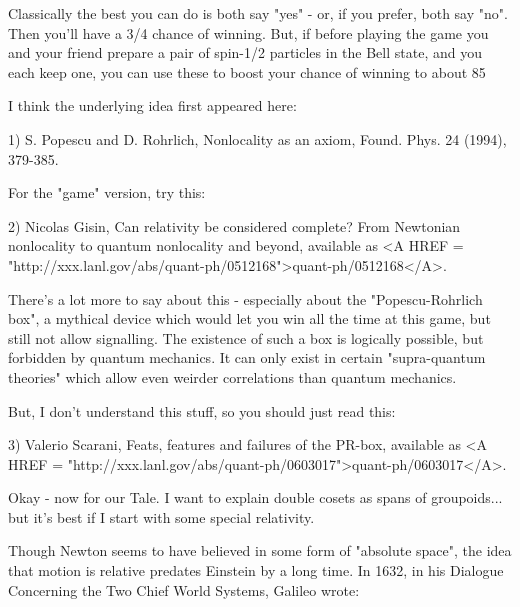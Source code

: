 Classically the best you can do is both say "yes" - or, if you
prefer, both say "no".  Then you'll have a 3/4 chance of winning.
But, if before playing the game you and your friend prepare a pair 
of spin-1/2 particles in the Bell state, and you each keep one, you 
can use these to boost your chance of winning to about 85%

I think the underlying idea first appeared here:

1) S. Popescu and D. Rohrlich, Nonlocality as an axiom, Found. Phys. 
24 (1994), 379-385.

For the "game" version, try this:

2) Nicolas Gisin, Can relativity be considered complete?  From
Newtonian nonlocality to quantum nonlocality and beyond, available
as <A HREF = "http://xxx.lanl.gov/abs/quant-ph/0512168">quant-ph/0512168</A>.

There's a lot more to say about this - especially about the 
"Popescu-Rohrlich box", a mythical device which would let you win 
all the time at this game, but still not allow signalling.  The 
existence of such a box is logically possible, but forbidden by 
quantum mechanics.  It can only exist in certain "supra-quantum
theories" which allow even weirder correlations than quantum mechanics.

But, I don't understand this stuff, so you should just read this:

3) Valerio Scarani, Feats, features and failures of the PR-box,
available as <A HREF = "http://xxx.lanl.gov/abs/quant-ph/0603017">quant-ph/0603017</A>.

Okay - now for our Tale.  I want to explain double cosets as spans 
of groupoids... but it's best if I start with some special relativity.

Though Newton seems to have believed in some form of "absolute 
space", the idea that motion is relative predates Einstein by a 
long time.  In 1632, in his Dialogue Concerning the Two Chief World Systems,
Galileo wrote:

